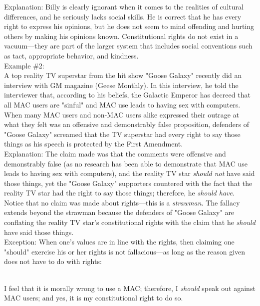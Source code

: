 \documentclass[a4paper,12pt,single,pdftex]{scrbook}
\begin{document}
    
      Explanation: Billy is clearly ignorant when it comes to the realities of cultural differences, and he seriously lacks social skills.  He is correct that he has every right to express his opinions, but he does not seem to mind offending and hurting others by making his opinions known.  Constitutional rights do not exist in a vacuum—they are part of the larger system that includes social conventions such as tact, appropriate behavior, and kindness.
    \\

    
      Example \#2:
    \\

    
      A top reality TV superstar from the hit show "Goose Galaxy" recently did an interview with GM magazine (Geese Monthly).  In this interview, he told the interviewer that, according to his beliefs, the Galactic Emperor has decreed that all MAC users are "sinful" and MAC use leads to having sex with computers.  When many MAC users and non-MAC users alike expressed their outrage at what they felt was an offensive and demonstrably false proposition, defenders of "Goose Galaxy" screamed that the TV superstar had every right to say those things as his speech is protected by the First Amendment.
    \\

    
      Explanation: The claim made was that the comments were offensive and demonstrably false (as no research has been able to demonstrate that MAC use leads to having sex with computers), and the reality TV star {\it should not} have said those things, yet the "Goose Galaxy" supporters countered with the fact that the reality TV star had the right to say those things; therefore, he {\it should have}.  Notice that no claim was made about rights—this is a {\it strawman}.  The fallacy extends beyond the strawman because the defenders of "Goose Galaxy" are conflating the reality TV star's constitutional rights with the claim that he {\it should}  have said those things.
    \\

    
      Exception: When one's values are in line with the rights, then claiming one "should" exercise his or her rights is not fallacious—as long as the reason given does not have to do with rights: \newline

    \\

    
      I feel that it is morally wrong to use a MAC; therefore, I {\it should}  speak out against MAC users; and yes, it is my constitutional right to do so.
    \\
\end{document}
